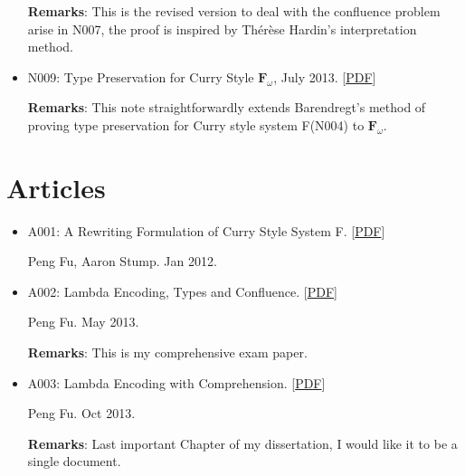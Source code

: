 \documentclass[10pt]{article}
\begin{document}
\begin{itemize}
\noindent \textbf{Remarks}: This is the revised version to deal with the confluence problem arise in N007, the proof is inspired by Thérèse Hardin's interpretation method. 

\item N009: Type Preservation for Curry Style $\mathbf{F}_{\omega}$, July 2013. [\href{../../document/notes/fomega-presv.pdf}{PDF}]

\noindent \textbf{Remarks}: This note straightforwardly extends Barendregt's method of proving type preservation for Curry style system F(N004) to $\mathbf{F}_{\omega}$. 


  
\end{itemize}

\section*{Articles}

\begin{itemize}
\item A001: A Rewriting Formulation of Curry Style System F. [\href{../../document/notes/rewrite-f.pdf}{PDF}]

\noindent Peng Fu, Aaron Stump. Jan 2012.

\item A002: Lambda Encoding, Types and Confluence. [\href{../../document/notes/comp-exam.pdf}{PDF}]

\noindent Peng Fu. May 2013.

\noindent \textbf{Remarks}: This is my comprehensive exam paper. 

\item A003: Lambda Encoding with Comprehension. [\href{../../document/notes/comprehension.pdf}{PDF}]

\noindent Peng Fu. Oct 2013.

\noindent \textbf{Remarks}: Last important Chapter of my dissertation, I would like it to be
a single document. 


\end{itemize}
\end{document}

